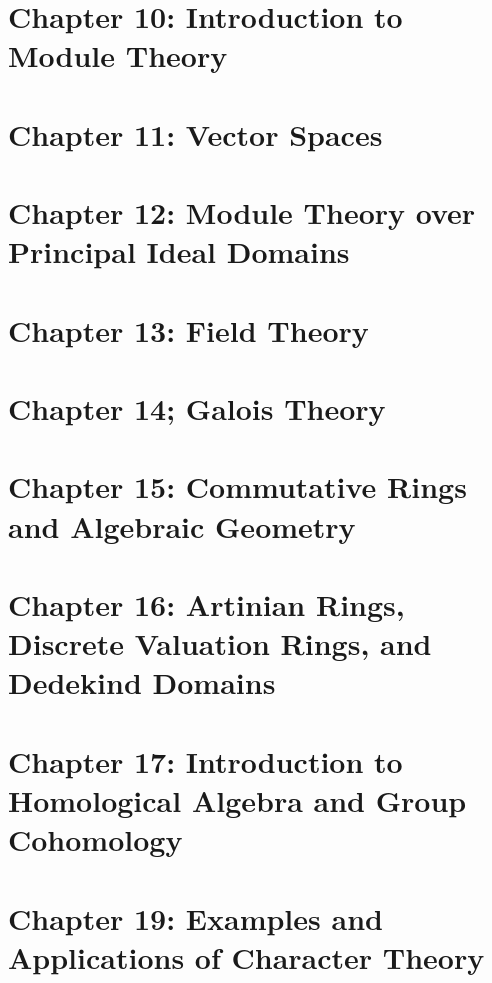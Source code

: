 \documentclass[11pt]{article}
\theoremstyle{definition}
\theoremstyle{remark}
\numberwithin{equation}{section}
\numberwithin{thm}{subsection}
\begin{document}
\newpage

\section{Chapter 10: Introduction to Module Theory}

\newpage

\section{Chapter 11: Vector Spaces}

\newpage
\section{Chapter 12: Module Theory over Principal Ideal Domains}

\newpage

\section{Chapter 13: Field Theory}

\newpage

\section{Chapter 14; Galois Theory}

\newpage


\section{Chapter 15: Commutative Rings and Algebraic Geometry}

\newpage

\section{Chapter 16: Artinian Rings, Discrete Valuation Rings, and Dedekind Domains}


\newpage

\section{Chapter 17: Introduction to Homological Algebra and Group Cohomology}

\newpage



\section{Chapter 19: Examples and Applications of Character Theory}
\end{document}
